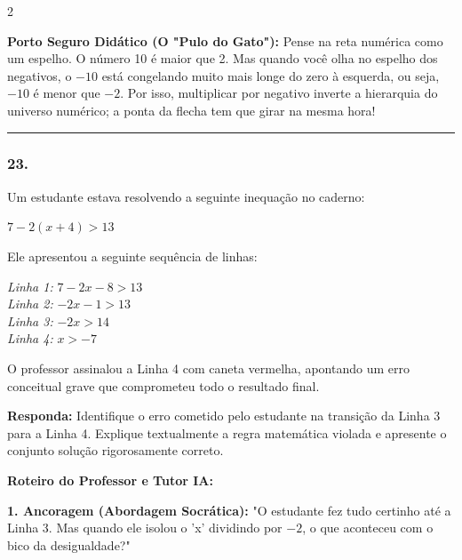 \begin{multicols*}{2}
    \begin{boxexplicacao}
    \textbf{Porto Seguro Didático (O "Pulo do Gato"):} Pense na reta numérica como um espelho. O número 10 é maior que 2. Mas quando você olha no espelho dos negativos, o $-10$ está congelando muito mais longe do zero à esquerda, ou seja, $-10$ é menor que $-2$. Por isso, multiplicar por negativo inverte a hierarquia do universo numérico; a ponta da flecha tem que girar na mesma hora!
    \end{boxexplicacao}
\fi

\par\vspace{\espacoQuestao}


\noindent\textcolor{CorLinha}{\rule{\linewidth}{0.5pt}}
\par\vspace{\espacoPreQuestao}
\subsubsection*{23.} 
\begin{enunciadoLiteral}
Um estudante estava resolvendo a seguinte inequação no caderno:

$ 7 - 2(x + 4) > 13 $

Ele apresentou a seguinte sequência de linhas:

\textit{Linha 1:} $ 7 - 2x - 8 > 13 $ \\
\textit{Linha 2:} $ -2x - 1 > 13 $ \\
\textit{Linha 3:} $ -2x > 14 $ \\
\textit{Linha 4:} $ x > -7 $

O professor assinalou a Linha 4 com caneta vermelha, apontando um erro conceitual grave que comprometeu todo o resultado final.

\begin{boxresponda}
\textbf{Responda:} Identifique o erro cometido pelo estudante na transição da Linha 3 para a Linha 4. Explique textualmente a regra matemática violada e apresente o conjunto solução rigorosamente correto.
\end{boxresponda}
\end{enunciadoLiteral}

\ifgabarito
    \begin{tcolorbox}[colback=CorTitUm!5, colframe=CorTitUm, boxrule=1pt, arc=4pt, left=6pt, right=6pt, top=6pt, bottom=6pt]
    \small\textbf{\textcolor{CorTitUm}{Roteiro do Professor e Tutor IA:}}\par\vspace{0.1cm}
    \color{CinzaEscuro}
    \textbf{1. Ancoragem (Abordagem Socrática):} "O estudante fez tudo certinho até a Linha 3. Mas quando ele isolou o 'x' dividindo por $-2$, o que aconteceu com o bico da desigualdade?"\par\vspace{0.1cm}
    

\end{tcolorbox}
\end{multicols*}
